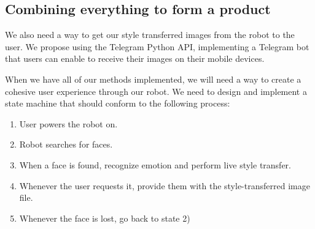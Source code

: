 \subsection{Combining everything to form a product}


We also need a way to get our style transferred images from the robot to the user. We propose using the Telegram Python API, implementing a Telegram bot that users can enable to receive their images on their mobile devices.

When we have all of our methods implemented, we will need a way to create a cohesive user experience through our robot. We need to design and implement a state machine that should conform to the following process:


\begin{enumerate}
  \item User powers the robot on.
  \item Robot searches for faces.
  \item When a face is found, recognize emotion and perform live style transfer.
  \item Whenever the user requests it, provide them with the style-transferred image file.
  \item Whenever the face is lost, go back to state 2)
\end{enumerate}